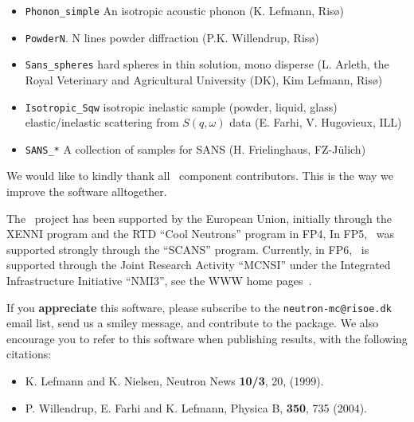 \begin{itemize}
\begin{itemize}
  \item \verb+Phonon_simple+ An isotropic acoustic phonon (K. Lefmann, Ris\o)
  \item \verb+PowderN+. N lines powder diffraction (P.K. Willendrup, Ris\o)
  \item \verb+Sans_spheres+ hard spheres in thin solution, mono disperse (L. Arleth, the Royal Veterinary and Agricultural University (DK), Kim Lefmann, Ris\o )
  \item \verb+Isotropic_Sqw+ isotropic inelastic sample (powder, liquid, glass) 
elastic/inelastic scattering from $S(q,\omega)$ data (E. Farhi, V. Hugovieux, ILL)
  \item \verb+SANS_*+ A collection of samples for SANS (H. Frielinghaus,  FZ-J\"ulich)
  \end{itemize}
\end{itemize}

We would like to kindly thank all \MCS\ component contributors. This is the way we improve the software alltogether.

The \MCS\ project has been supported by the European Union, initially
through the XENNI program and the RTD ``Cool Neutrons'' program in FP4,
In FP5, \MCS\ was supported strongly through the
``SCANS'' program.
Currently, in FP6, \MCS\ is supported through the Joint Research Activity
``MCNSI'' under the Integrated Infrastructure Initiative ``NMI3'', see
the WWW home pages~\cite{mcnsi_webpage,nmi3_webpage}.

If you {\bf appreciate} this software, please subscribe to the \verb+neutron-mc@risoe.dk+ email list, send us a smiley message, and contribute to the package. We also encourage you to refer to this software when publishing results, with the following citations:
\begin{itemize}
\item{K. Lefmann and K. Nielsen, Neutron News {\bf 10/3}, 20, (1999).}
\item{P. Willendrup, E. Farhi and K. Lefmann, Physica B, {\bf 350}, 735 (2004).}
\end{itemize}






